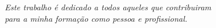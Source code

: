\begin{dedicatoria}
   \vspace*{\fill}
   \centering
   \noindent

   \textit{Este trabalho é dedicado a todos aqueles que contribuiram\\
   para a minha formação como pessoa e profissional.} \vspace*{\fill}
\end{dedicatoria}
